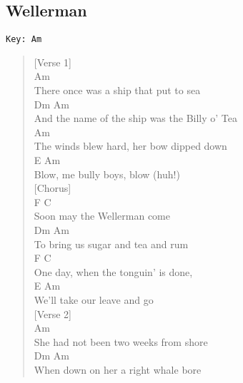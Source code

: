 \documentclass[11pt]{article}
\begin{document}
\subsection{Wellerman}
\label{sec:org2eec812}
\begin{verbatim}
Key: Am
\end{verbatim}
\begin{verse}
[Verse 1]\\
\vspace*{1em}
\hspace*{3em}Am\\
There once was a ship that put to sea\\
\hspace*{9em}Dm                      Am\\
And the name of the ship was the Billy o' Tea\\
\hspace*{5em}Am\\
The winds blew hard, her bow dipped down\\
\hspace*{1em}E                    Am\\
Blow, me bully boys, blow (huh!)\\
\vspace*{1em}
[Chorus]\\
\vspace*{1em}
\hspace*{1em}F            C\\
Soon may the Wellerman come\\
\hspace*{4em}Dm                Am\\
To bring us sugar and tea and rum\\
F                  C\\
One day, when the tonguin’ is done,\\
\hspace*{7em}E                 Am\\
We’ll take our leave and go\\
\vspace*{1em}
[Verse 2]\\
\vspace*{1em}
\hspace*{4em}Am\\
She had not been two weeks from shore\\
\hspace*{6em}Dm            Am\\
When down on her a right whale bore\\

\end{verse}
\end{document}
